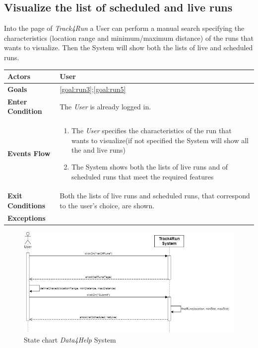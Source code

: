  \subsection{Visualize the list of scheduled and live runs}
Into the page of \emph{Track4Run} a User can perform a manual search specifying the characteristics (location range and minimum/maximum distance) of the runs that wants to visualize. Then the System will show both the lists of live and scheduled runs. 

\begin{table}[H]
	\centering
    
    \begin{tabular}{|p{3.5cm}|p{10.3cm}|}
    
    \hline
    \textbf{\large{Actors}}  			& \tabitem User 	\\
    				 					
    \hline
    \textbf{\large{Goals}} 				& \ref{goal:run3};\ref{goal:run5}\\
    
    \hline
    \textbf{\large{Enter Condition}}	& The \emph{User} is already logged in.		\\
    
    \hline
    \textbf{\large{Events Flow}}		& \begin{enumerate}[leftmargin=0.5cm]
                                          	\item The \emph{User} specifies the characteristics of the run that wants to visualize(if not specified the System will show all the  and live runs)  
                                          	 \item The System shows both the lists of live runs and of scheduled runs that meet the required features
                                          \end{enumerate}
    										\\
    \hline
    \textbf{\large{Exit Conditions}}    & Both the lists of live runs and scheduled runs, that correspond to the user's choice, are shown.  \\
    
    \hline
    \textbf{\large{Exceptions}} 		& \\
    
    \hline
    
    
    \end{tabular}
	
\end{table}

\begin{figure}[H]
    \centering
    \includegraphics[scale=0.4]{Pictures/visualizeListsSeqDiag.png}
    \caption{State chart  \emph{Data4Help} System}
\end{figure}

